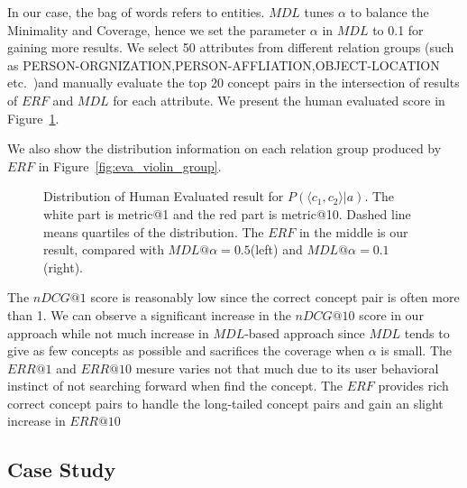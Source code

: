 In our case, the bag of words refers to entities.
$MDL$ tunes $\alpha$ to balance the \ac{Minimality} and \ac{Coverage}, hence we set the parameter $\alpha$ in $MDL$ to 0.1 for gaining more results.
We select 50 attributes from different relation groups (such as \ac{PERSON-ORGNIZATION,PERSON-AFFLIATION,OBJECT-LOCATION} etc.\ )and manually evaluate the top 20 concept pairs in the intersection of results of $ERF$ and $MDL$ for each attribute.
We present the human evaluated score in Figure~\ref{fig:eva_violin_pc1c2ga}.

We also show the distribution information on each relation group produced by $ERF$ in Figure~\ref{fig:eva_violin_group}.

\begin{figure}[!htb]
\centering
{}
\caption{Distribution of Human Evaluated result for $P(\langle c_1,c_2 \rangle|a)$. \small The white part is metric@1 and the red part is metric@10. Dashed line means quartiles of the distribution. The $ERF$ in the middle is our result, compared with $MDL@\alpha=0.5$(left) and $MDL@\alpha=0.1$(right). }
\label{fig:eva_violin_pc1c2ga}
\end{figure}

The $nDCG@1$ score is reasonably low since the correct concept pair is often more than 1.
We can observe a significant increase in the $nDCG@10$ score in our approach while not much increase in $MDL$-based approach since $MDL$ tends to give as few concepts as possible and sacrifices the coverage when $\alpha$ is small.
The $ERR@1$ and $ERR@10$ mesure varies not that much due to its user behavioral instinct of not searching forward when find the concept.
The $ERF$ provides rich correct concept pairs to handle the long-tailed concept pairs and gain an slight increase in $ERR@10$

\begin{figure*}[!htb]
\centering
{}
\caption{Distribution of Human Evaluated result for $P(\langle c_1,c_2 \rangle|a)$ produced by $ERF$. \small Each seperate graph represents a relations group.}
\label{fig:eva_violin_group}
\end{figure*}



\subsection{Case Study}

